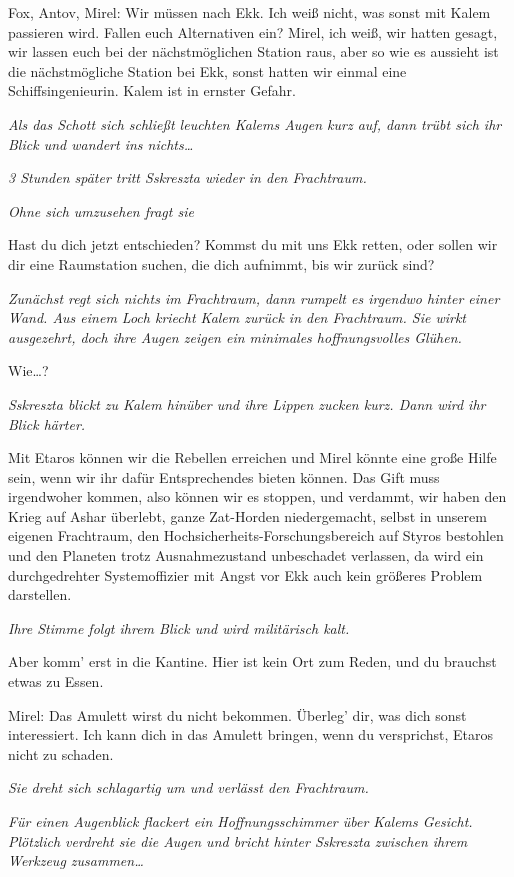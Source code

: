 \documentclass[11pt]{scrartcl}
\begin{document}
Fox, Antov, Mirel: Wir müssen nach Ekk. Ich weiß nicht, was sonst mit
Kalem passieren wird. Fallen euch Alternativen ein? Mirel, ich weiß, wir
hatten gesagt, wir lassen euch bei der nächstmöglichen Station raus,
aber so wie es aussieht ist die nächstmögliche Station bei Ekk, sonst
hatten wir einmal eine Schiffsingenieurin. Kalem ist in ernster Gefahr.

\emph{Als das Schott sich schließt leuchten Kalems Augen kurz auf, dann
trübt sich ihr Blick und wandert ins nichts\ldots{}}

\emph{3 Stunden später tritt Sskreszta wieder in den Frachtraum.}

\emph{Ohne sich umzusehen fragt sie}

Hast du dich jetzt entschieden? Kommst du mit uns Ekk retten, oder
sollen wir dir eine Raumstation suchen, die dich aufnimmt, bis wir
zurück sind?

\emph{Zunächst regt sich nichts im Frachtraum, dann rumpelt es irgendwo
hinter einer Wand. Aus einem Loch kriecht Kalem zurück in den
Frachtraum. Sie wirkt ausgezehrt, doch ihre Augen zeigen ein minimales
hoffnungsvolles Glühen.}

Wie\ldots{}?

\emph{Sskreszta blickt zu Kalem hinüber und ihre Lippen zucken kurz.
Dann wird ihr Blick härter.}

Mit Etaros können wir die Rebellen erreichen und Mirel könnte eine große
Hilfe sein, wenn wir ihr dafür Entsprechendes bieten können. Das Gift
muss irgendwoher kommen, also können wir es stoppen, und verdammt, wir
haben den Krieg auf Ashar überlebt, ganze Zat-Horden niedergemacht,
selbst in unserem eigenen Frachtraum, den
Hochsicherheits-Forschungsbereich auf Styros bestohlen und den Planeten
trotz Ausnahmezustand unbeschadet verlassen, da wird ein durchgedrehter
Systemoffizier mit Angst vor Ekk auch kein größeres Problem darstellen.

\emph{Ihre Stimme folgt ihrem Blick und wird militärisch kalt.}

Aber komm' erst in die Kantine. Hier ist kein Ort zum Reden, und du
brauchst etwas zu Essen.

Mirel: Das Amulett wirst du nicht bekommen. Überleg' dir, was dich sonst
interessiert. Ich kann dich in das Amulett bringen, wenn du versprichst,
Etaros nicht zu schaden.

\emph{Sie dreht sich schlagartig um und verlässt den Frachtraum.}

\emph{Für einen Augenblick flackert ein Hoffnungsschimmer über Kalems
Gesicht. Plötzlich verdreht sie die Augen und bricht hinter Sskreszta
zwischen ihrem Werkzeug zusammen\ldots{}}
\end{document}
